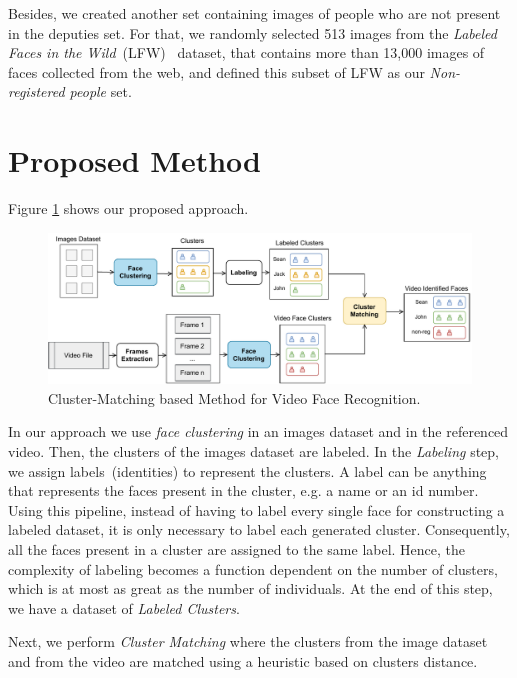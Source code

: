 Besides, we created another set containing images of people who are not present in the deputies set.
For that, we randomly selected 513 images from the \emph{Labeled Faces in the Wild}~(LFW)~\cite{LFWTech} dataset, that contains more than 13,000 images of faces collected from the web,
and defined this subset of LFW as our \emph{Non-registered people} set.

\section{Proposed Method}
\label{sec:recognition_method}


Figure \ref{fig:cluster_matching} shows our proposed approach.

\begin{figure}[!ht]
    \centering
    \includegraphics[width=\textwidth]{img/face_clustering/cluster_matching_process.pdf}
    \caption{Cluster-Matching based Method for Video Face Recognition.}
    \label{fig:cluster_matching}
\end{figure}

In our approach we use \emph{face clustering} in an images dataset and in the referenced video. Then, the clusters of the images dataset are labeled. 
In the \textit{Labeling} step, we assign labels~(identities) to represent the clusters.
A label can be anything that represents the faces present in the cluster, e.g. a name or an id number. 
Using this pipeline, instead of having to label every single face for constructing a labeled dataset, it is only necessary to label each generated cluster.
Consequently, all the faces present in a cluster are assigned to the same label. 
Hence, the complexity of labeling becomes a function dependent on the number of clusters, which is at most as great as the number of individuals.
At the end of this step, we have a dataset of \emph{Labeled Clusters}.


Next, we perform \emph{Cluster Matching} where the clusters from the image dataset and from the video are matched using a heuristic based on clusters distance.

